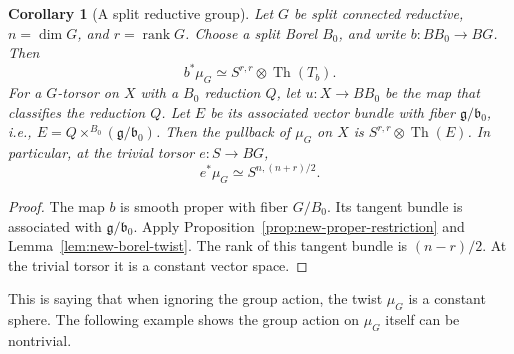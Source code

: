 \documentclass[11pt,reqno]{amsart}
\newtheorem{corollary}[theorem]{Corollary}
\theoremstyle{definition}
\theoremstyle{remark}
\theoremstyle{plain}
\numberwithin{equation}{section}
\DeclareMathOperator{\Th}{Th}
\begin{document}
\begin{corollary}[A split reductive group]\label{cor:new-split-reductive}
Let \(G\) be split connected reductive, \(n=\dim G\), and \(r=\operatorname{rank}G\).
Choose a split Borel \(B_0\), and write \(b:BB_0\to BG\).
Then
\begin{equation}\label{eq:new-borel-restriction}
 b^*\mu_G\simeq S^{r,r}\otimes\Th(T_b).
\end{equation}
For a \(G\)-torsor on \(X\) with a \(B_0\) reduction \(Q\), 
let \(u: X \to BB_0\) be the map that classifies the reduction \(Q\).
Let \(E\) be its associated vector bundle with fiber 
\(\mathfrak g/\mathfrak b_0\), i.e., \(E = Q \times^{B_0} (\mathfrak{g}/\mathfrak{b}_0)\).
Then the pullback of \(\mu_G\) on \(X\) is \(S^{r,r}\otimes\Th(E)\).
In particular, at the trivial torsor \(e:S\to BG\),
\[
 e^*\mu_G\simeq S^{n,(n+r)/2}.
\]
\end{corollary}
\begin{proof}
The map \(b\) is smooth proper with fiber \(G/B_0\).
Its tangent bundle is associated with \(\mathfrak g/\mathfrak b_0\).
Apply Proposition~\ref{prop:new-proper-restriction} and Lemma~\ref{lem:new-borel-twist}.
The rank of this tangent bundle is \((n-r)/2\).
At the trivial torsor it is a constant vector space.
\end{proof}

This is saying that when ignoring the group action, the twist \(\mu_G\) is a constant sphere.
The following example shows the group action on \(\mu_G\) itself can be nontrivial. 
\end{document}
